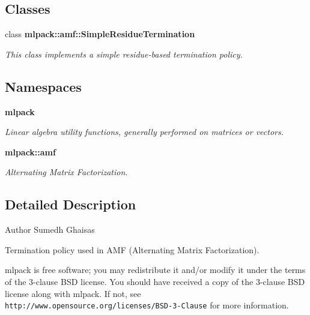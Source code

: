 \subsection*{Classes}
\begin{DoxyCompactItemize}
\item 
class {\bf mlpack\+::amf\+::\+Simple\+Residue\+Termination}
\begin{DoxyCompactList}\small\item\em This class implements a simple residue-\/based termination policy. \end{DoxyCompactList}\end{DoxyCompactItemize}
\subsection*{Namespaces}
\begin{DoxyCompactItemize}
\item 
 {\bf mlpack}
\begin{DoxyCompactList}\small\item\em Linear algebra utility functions, generally performed on matrices or vectors. \end{DoxyCompactList}\item 
 {\bf mlpack\+::amf}
\begin{DoxyCompactList}\small\item\em Alternating Matrix Factorization. \end{DoxyCompactList}\end{DoxyCompactItemize}


\subsection{Detailed Description}
\begin{DoxyAuthor}{Author}
Sumedh Ghaisas
\end{DoxyAuthor}
Termination policy used in A\+MF (Alternating Matrix Factorization).

mlpack is free software; you may redistribute it and/or modify it under the terms of the 3-\/clause B\+SD license. You should have received a copy of the 3-\/clause B\+SD license along with mlpack. If not, see {\tt http\+://www.\+opensource.\+org/licenses/\+B\+S\+D-\/3-\/\+Clause} for more information. 